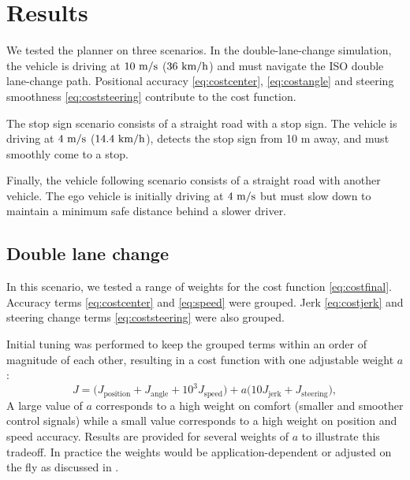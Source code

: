 \documentclass[letterpaper, 10 pt, conference]{ieeeconf}  %
\begin{document}
 
 
 \section{Results}
 We tested the planner on three scenarios. In the double-lane-change simulation, the vehicle is driving at $10\ \ms$ ($36\ \text{km}/\text{h}$) and must navigate the ISO double lane-change path. Positional accuracy \eqref{eq:costcenter}, \eqref{eq:costangle} and steering smoothness \eqref{eq:coststeering} contribute to the cost function.
 
 The stop sign scenario consists of a straight road with a stop sign. The vehicle is driving at $4\ \text{m}/\text{s}$ ($14.4\ \text{km}/\text{h}$), detects the stop sign from 10 m away, and must smoothly come to a stop.
 
Finally, the vehicle following scenario consists of a straight road with another vehicle. The ego vehicle is initially driving at $4\ \text{m}/\text{s}$ but must slow down to maintain a minimum safe distance behind a slower driver.

 \subsection{Double lane change}
 
In this scenario, we tested a range of weights for the cost function \eqref{eq:costfinal}. Accuracy terms \eqref{eq:costcenter} and \eqref{eq:speed} were grouped. Jerk \eqref{eq:costjerk} and steering change terms \eqref{eq:coststeering} were also grouped.
 
 Initial tuning was performed to keep the grouped terms within an order of magnitude of each other, resulting in a cost function with one adjustable weight $a$:
 $$J = \Big( J_{\text{position}} + J_{\text{angle}} + 10^3J_{\text{speed}} \Big) + a\Big( 10J_\text{{jerk}} + J_{\text{steering}}\Big),$$
 A large value of $a$ corresponds to a high weight on comfort (smaller and smoother control signals) while a small value corresponds to a high weight on position and speed accuracy.
 Results are provided for several weights of $a$ to illustrate this tradeoff.
 In practice the weights would be application-dependent or adjusted on the fly as discussed in \cite{nmpc_micheli}.
 
\end{document}
